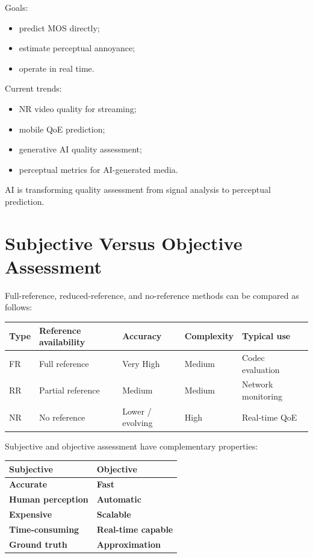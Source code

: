 Goals:

\begin{itemize}
\item predict MOS directly;
\item estimate perceptual annoyance;
\item operate in real time.
\end{itemize}

Current trends:

\begin{itemize}
\item NR video quality for streaming;
\item mobile QoE prediction;
\item generative AI quality assessment;
\item perceptual metrics for AI-generated media.
\end{itemize}

AI is transforming quality assessment from signal analysis to perceptual prediction.

\section{Subjective Versus Objective Assessment}

Full-reference, reduced-reference, and no-reference methods can be compared as follows:

\begin{center}
\begin{tabular}{|l|l|l|l|l|}
\hline
\textbf{Type} & \textbf{Reference availability} & \textbf{Accuracy} & \textbf{Complexity} & \textbf{Typical use} \\ \hline
FR & Full reference & Very High & Medium & Codec evaluation \\ \hline
RR & Partial reference & Medium & Medium & Network monitoring \\ \hline
NR & No reference & Lower / evolving & High & Real-time QoE \\ \hline
\end{tabular}
\end{center}

Subjective and objective assessment have complementary properties:

\begin{center}
\begin{tabular}{|l|l|}
\hline
\textbf{Subjective} & \textbf{Objective} \\ \hline
\textbf{Accurate} & \textbf{Fast} \\ \hline
\textbf{Human perception} & \textbf{Automatic} \\ \hline
\textbf{Expensive} & \textbf{Scalable} \\ \hline
\textbf{Time-consuming} & \textbf{Real-time capable} \\ \hline
\textbf{Ground truth} & \textbf{Approximation} \\ \hline
\end{tabular}
\end{center}

